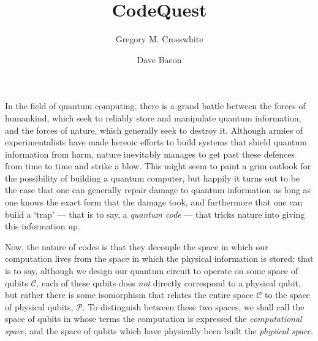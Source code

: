 \documentclass[twocolumn,showpacs,preprintnumbers,amsmath,amssymb,nofootinbib,pra,floatfix]{revtex4}
\begin{document}
\title{CodeQuest}

\author{Gregory M. Crosswhite}

\author{Dave Bacon}




\maketitle

\newpage

\tableofcontents
In the field of quantum computing, there is a grand battle between the
forces of humankind, which seek to reliably store and manipulate
quantum information, and the forces of nature, which generally seek to
destroy it.  Although armies of experimentalists have made hereoic
efforts to build systems that shield quantum information from harm,
nature inevitably manages to get past these defences from time to time
and strike a blow.  This might seem to paint a grim outlook for the
possibility of building a quantum computer, but happily it turns out
to be the case that one can generally repair damage to quantum
information as long as one knows the exact form that the damage took,
and furthermore that one can build a `trap' --- that is to say, a
\emph{quantum code} --- that tricks nature into giving this
information up.

Now, the nature of codes is that they decouple the space in which our
computation lives from the space in which the physical information is
stored; that is to say, although we design our quantum circuit to
operate on some space of qubits $\mathscr{C}$, each of these qubits
does \emph{not} directly correspond to a physical qubit, but rather
there is some isomorphism that relates the entire space $\mathscr{C}$
to the space of physical qubits, $\mathscr{P}$.  To distinguish
between these two spaces, we shall call the space of qubits in whose
terms the computation is expressed the \emph{computational space}, and
the space of qubits which have physically been built the
\emph{physical space}.
\end{document}
